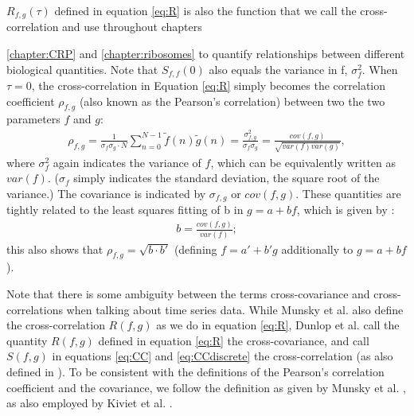 $R_{f,g}(\tau)$ defined in equation \ref{eq:R} is also the function that we call the cross-correlation and use throughout chapters {\ref{chapter:CRP} and \ref{chapter:ribosomes} to quantify relationships between different biological quantities.
%
Note that $S_{f,f}(0)$ also equals the variance in f, $\sigma^2_f$. 
%
When $\tau=0$, the cross-correlation in Equation \ref{eq:R} simply becomes the correlation coefficient $\rho_{f,g}$ (also known as the Pearson's correlation) between two the two parameters $f$ and $g$:
%
%
\begin{align}
	\label{correlationCoefficient}
	\rho_{f,g}=		
	\frac{1}{\sigma_f \sigma_g \cdot N} 
	\sum_{n=0}^{N-1} {\tilde{f}(n) \tilde{g}(n)}
	=
	\frac{\sigma^2_{f,g}}{\sigma_f \sigma_g}
	=
	\frac{cov(f,g)}{\sqrt{var(f)var(g)}},
\end{align}
where $\sigma^2_f$ again indicates the variance of $f$, which can be equivalently written as $var(f)$. ($\sigma_f$ simply indicates the standard deviation, the square root of the variance.) The covariance is indicated by $\sigma_{f,g}$ or $cov(f,g)$.
%
%
%
These quantities are tightly related to the least squares fitting of b in $g=a+bf$, which is given by \cite[see lemma "Correlation Coefficient"]{Weisstein2018}:
\begin{align}
b = \frac{cov(f,g)}{var(f)};
\end{align}
this also shows that $\rho_{f,g} = \sqrt { b \cdot b' }$ (defining $f=a'+b'g$ additionally to $g=a+bf$).

Note that there is some ambiguity between the terms cross-covariance and cross-correlations when talking about time series data. 
While Munsky et al. \cite{Munsky2012} also define the cross-correlation $R(f,g)$ as we do in equation \ref{eq:R}, Dunlop et al. \cite{Dunlop2008} call the quantity $R(f,g)$ defined in equation \ref{eq:R} the cross-covariance, and call $S(f,g)$ in equations \ref{eq:CC} and \ref{eq:CCdiscrete} the cross-correlation (as also defined in \cite[see lemma "Cross-Correlation"]{Weisstein2018}). To be consistent with the definitions of the Pearson's correlation coefficient and the covariance, we follow the definition as given by Munsky et al. \cite{Munsky2012}, as also employed by Kiviet et al. \cite{Kiviet2010, Kiviet2014}.




}

